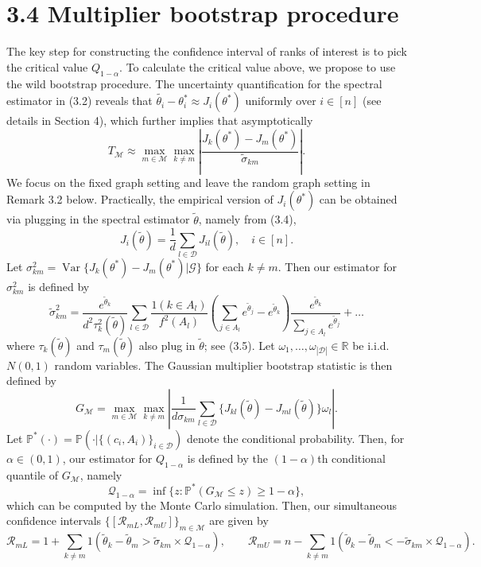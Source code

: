 \section{3.4 Multiplier bootstrap procedure}\label{multiplier-bootstrap-procedure}

The key step for constructing the confidence interval of ranks of interest is to pick the critical value \(Q_{1 - \alpha}\). To calculate the critical value above, we propose to use the wild bootstrap procedure. The uncertainty quantification for the spectral estimator in (3.2) reveals that \(\widetilde{\theta_{i}} - \theta_{i}^{*} \approx J_{i}(\theta^{*})\) uniformly over \(i \in [n]\) (see details in Section 4), which further implies that asymptotically
\[
T_{\mathcal{M}} \approx \max_{m \in \mathcal{M}} \max_{k \neq m} \left| \frac{J_{k}(\theta^{*}) - J_{m}(\theta^{*})}{\widetilde{\sigma}_{km}} \right|. \tag{3.12}
\]
We focus on the fixed graph setting and leave the random graph setting in Remark 3.2 below. Practically, the empirical version of \(J_{i}(\theta^{*})\) can be obtained via plugging in the spectral estimator \(\widetilde{\theta}\), namely from (3.4),
\[
J_{i}(\widetilde{\theta}) = \frac{1}{d} \sum_{l \in \mathcal{D}} J_{il}(\widetilde{\theta}), \quad i \in [n].
\]
Let \(\sigma_{km}^{2} = \operatorname {Var}\{J_{k}(\theta^{*}) - J_{m}(\theta^{*}) | \mathcal{G} \}\) for each \(k \neq m\). Then our estimator for \(\sigma_{km}^{2}\) is defined by
\[
\widetilde{\sigma}_{km}^{2} = \frac{e^{\widetilde{\theta}_{k}}}{d^{2} \tau_{k}^{2}(\widetilde{\theta})} \sum_{l \in \mathcal{D}} \frac{1(k \in A_{l})}{f^{2}(A_{l})} \left(\sum_{j \in A_{l}} e^{\widetilde{\theta}_{j}} - e^{\widetilde{\theta}_{k}}\right) \frac{e^{\widetilde{\theta}_{k}}}{\sum_{j \in A_{l}} e^{\widetilde{\theta}_{j}}} + \dots
\]
where \(\tau_{k}(\widetilde{\theta})\) and \(\tau_{m}(\widetilde{\theta})\) also plug in \(\widetilde{\theta}\); see (3.5). Let \(\omega_{1}, \ldots , \omega_{|\mathcal{D}|} \in \mathbb{R}\) be i.i.d. \(N(0,1)\) random variables. The Gaussian multiplier bootstrap statistic is then defined by
\[
G_{\mathcal{M}} = \max_{m \in \mathcal{M}} \max_{k \neq m} \left| \frac{1}{d \sigma_{km}} \sum_{l \in \mathcal{D}} \{J_{kl}(\widetilde{\theta}) - J_{ml}(\widetilde{\theta})\} \omega_{l} \right|. \tag{3.14}
\]
Let \(\mathbb{P}^{*}(\cdot) = \mathbb{P}(\cdot | \{(c_{i}, A_{i})\}_{i \in \mathcal{D}})\) denote the conditional probability. Then, for \(\alpha \in (0,1)\), our estimator for \(Q_{1 - \alpha}\) is defined by the \((1 - \alpha)\)th conditional quantile of \(G_{\mathcal{M}}\), namely
\[
\mathcal{Q}_{1 - \alpha} = \inf \{z: \mathbb{P}^{*}(G_{\mathcal{M}} \leq z) \geq 1 - \alpha \} ,
\]
which can be computed by the Monte Carlo simulation. Then, our simultaneous confidence intervals \(\{[\mathcal{R}_{mL}, \mathcal{R}_{mU}] \}_{m \in \mathcal{M}}\) are given by
\[
\mathcal{R}_{mL} = 1 + \sum_{k \neq m} 1 \left(\widetilde{\theta}_{k} - \widetilde{\theta}_{m} > \widetilde{\sigma}_{km} \times \mathcal{Q}_{1 - \alpha}\right), \qquad \mathcal{R}_{mU} = n - \sum_{k \neq m} 1 \left(\widetilde{\theta}_{k} - \widetilde{\theta}_{m} < -\widetilde{\sigma}_{km} \times \mathcal{Q}_{1 - \alpha}\right).
\]

